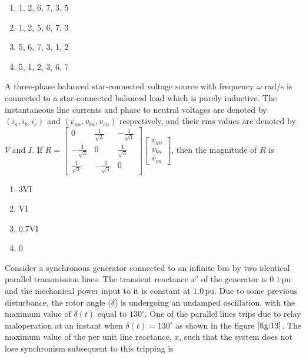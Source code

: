     \begin{multicols}{4}
    \begin{enumerate}
        \item 1, 2, 6, 7, 3, 5
        \item 1, 2, 5, 6, 7, 3
        \item 5, 6, 7, 3, 1, 2
        \item 5, 1, 2, 3, 6, 7
    \end{enumerate}
    \end{multicols}
    \bigskip
    \item A three-phase balanced star-connected voltage source with frequency $\omega$ rad/s is connected to a star-connected balanced load which is purely inductive. The instantaneous line currents and phase to neutral voltages are denoted by $(i_a, i_b, i_c)$ and $(v_{an}, v_{bn}, v_{cn})$ respectively, and their rms values are denoted by $V$ and $I$.
    If $R = \begin{bmatrix}
    0 & \frac{1}{\sqrt{3}} & -\frac{1}{\sqrt{3}} \\
    -\frac{1}{\sqrt{3}} & 0 & \frac{1}{\sqrt{3}} \\
    \frac{1}{\sqrt{3}} & -\frac{1}{\sqrt{3}} & 0
    \end{bmatrix} \begin{bmatrix}
    v_{an} \\
    v_{bn} \\
    v_{cn}
\end{bmatrix}$, then the magnitude of $R$ is
\begin{multicols}{4}
\begin{enumerate}
    \item 3VI
    \item VI
    \item 0.7VI
    \item 0
\end{enumerate}
\end{multicols}
    \bigskip
    \item 
Consider a synchronous generator connected to an infinite bus by two identical parallel transmission lines. The transient reactance $x'$ of the generator is $0.1 \, \text{pu}$ and the mechanical power input to it is constant at $1.0 \, \text{pu}$. Due to some previous disturbance, the rotor angle ($\delta$) is undergoing an undamped oscillation, with the maximum value of $\delta(t)$ equal to $130^\circ$. One of the parallel lines trips due to relay maloperation at an instant when $\delta(t) = 130^\circ$ as shown in the figure $\ref{fig:13}$. The maximum value of the per unit line reactance, $x$, such that the system does not lose synchronism subsequent to this tripping is

